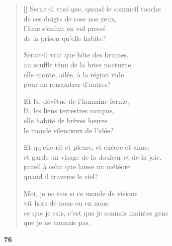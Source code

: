 \documentclass[a4paper,12pt]{book}
\begin{document}
\begin{verse}[\versewidth]
  Serait-il vrai que, quand le sommeil touche \\
  de ses doigts de rose nos yeux, \\
  l'âme s'enfuit en vol pressé \\
  de la prison qu'elle habite?

  Serait-il vrai que hôte des brumes, \\
  au souffle ténu de la brise nocturne, \\
  elle monte, ailée, à la région vide \\
  pour en rencontrer d'autres?

  Et là, dévêtue de l'humaine forme, \\
  là, les liens terrestres rompus, \\
  elle habite de brèves heures \\
  le monde silencieux de l'idée?

  Et qu'elle rit et pleure, et exècre et aime, \\
  et garde un visage de la douleur et de la joie, \\
  pareil à celui que laisse un météore \\
  quand il traverse le ciel?

  Moi, je ne sais si ce monde de visions \\
  vit hors de nous ou en nous: \\
  ce que je sais, c'est que je connais maintes gens \\
  que je ne connais pas.
\end{verse}

\bigskip

\begin{center}
  \textbf{76}
\end{center}

\settowidth{\versewidth}{« Oh, quel amour sans paroles que celui de la mort!}
\end{document}
